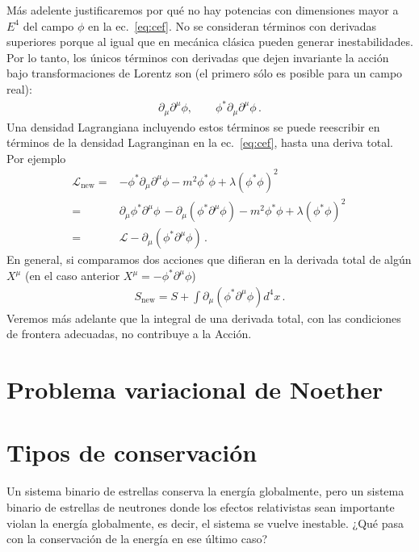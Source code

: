Más adelente justificaremos por qué no hay potencias con dimensiones mayor a $E^{4}$ del campo $\phi$ en la ec.~\eqref{eq:cef}. No se consideran términos con derivadas superiores porque al igual que en mecánica clásica pueden generar inestabilidades. Por lo tanto, los únicos términos con derivadas que dejen invariante la acción bajo transformaciones de Lorentz son (el primero sólo es posible para un campo real):
\begin{align}
  \partial_{\mu}\partial^{\mu}\phi,\qquad \phi^{*}\partial_{\mu}\partial^{\mu}\phi\,.
\end{align}
Una densidad Lagrangiana incluyendo estos términos se puede reescribir en términos de la densidad Lagranginan en la ec.~\eqref{eq:cef}, hasta una deriva total. Por ejemplo
\begin{align}
  \mathcal{L}_{\text{new}}=&-\phi^{*}\partial_{\mu}\partial^{\mu}\phi-m^2\phi^{*}\phi+\lambda \left(\phi^{*}\phi \right)^2\,\nonumber\\
=&\partial_{\mu}\phi^{*}\partial^{\mu}\phi\,-\partial_{\mu}\left(\phi^{*}\partial^{\mu}\phi\right)-m^2\phi^{*}\phi+\lambda \left(\phi^{*}\phi \right)^2\,\nonumber\\
=&\mathcal{L}-\partial_{\mu}\left(\phi^{*}\partial^{\mu}\phi\right)\,.
\end{align}
En general, si comparamos dos acciones que difieran en la derivada total de algún $X^{\mu}$ (en el caso anterior $X^{\mu}=-\phi^{*}\partial^{\mu}\phi$)
\begin{align}
  S_{\text{new}}=S+\int \partial_{\mu}\left(\phi^{*}\partial^{\mu}\phi\right)d^4x\,.
\end{align}
Veremos más adelante que la integral de una derivada total, con las condiciones de frontera adecuadas, no contribuye a la Acción.





\section{Problema variacional de Noether}

\section{Tipos de conservación }
Un sistema binario de estrellas conserva la energía globalmente, pero un sistema binario de estrellas de neutrones donde los efectos relativistas sean importante violan la energía globalmente, es decir, el sistema se vuelve inestable. ¿Qué pasa con la conservación de la energía en ese último caso?

